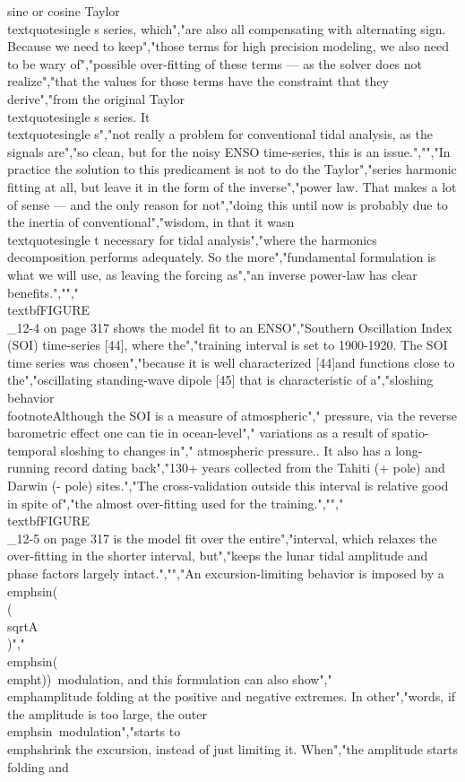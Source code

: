 {{{{{{{{{{sine or cosine Taylor\\textquotesingle s series, which","are also all compensating with alternating sign. Because we need to keep","those terms for high precision modeling, we also need to be wary of","possible over-fitting of these terms --- as the solver does not realize","that the values for those terms have the constraint that they derive","from the original Taylor\\textquotesingle s series. It\\textquotesingle s","not really a problem for conventional tidal analysis, as the signals are","so clean, but for the noisy ENSO time-series, this is an issue.","","In practice the solution to this predicament is not to do the Taylor","series harmonic fitting at all, but leave it in the form of the inverse","power law. That makes a lot of sense --- and the only reason for not","doing this until now is probably due to the inertia of conventional","wisdom, in that it wasn\\textquotesingle t necessary for tidal analysis","where the harmonics decomposition performs adequately. So the more","fundamental formulation is what we will use, as leaving the forcing as","an inverse power-law has clear benefits.","","\\textbf{FIGURE\\_12-4 on page 317} shows the model fit to an ENSO","Southern Oscillation Index (SOI) time-series {[}44{]}, where the","training interval is set to 1900-1920. The SOI time series was chosen","because it is well characterized {[}44{]}and functions close to the","oscillating standing-wave dipole {[}45{]} that is characteristic of a","sloshing behavior\\footnote{Although the SOI is a measure of atmospheric","  pressure, via the reverse barometric effect one can tie in ocean-level","  variations as a result of spatio-temporal sloshing to changes in","  atmospheric pressure.}. It also has a long-running record dating back","130+ years collected from the Tahiti (+ pole) and Darwin (- pole) sites.","The cross-validation outside this interval is relative good in spite of","the almost over-fitting used for the training.","","\\textbf{FIGURE\\_12-5 on page 317} is the model fit over the entire","interval, which relaxes the over-fitting in the shorter interval, but","keeps the lunar tidal amplitude and phase factors largely intact.","","An excursion-limiting behavior is imposed by a \\emph{sin}(\\(\\sqrt{A}\\)","\\emph{sin}(\\emph{t}))~modulation, and this formulation can also show","\\emph{amplitude folding} at the positive and negative extremes. In other","words, if the amplitude is too large, the outer \\emph{sin}~modulation","starts to \\emph{shrink} the excursion, instead of just limiting it. When","the amplitude starts folding and }}}}}}}}}}
